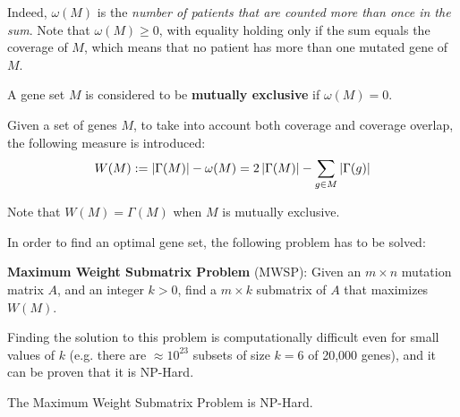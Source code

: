 Indeed, $\omega(M)$ is the \textit{number of patients that are counted more than once in the sum}. Note that $\omega(M) \ge 0$, with equality holding only if the sum equals the coverage of $M$, which means that no patient has more than one mutated gene of $M$.

\begin{definition}
    A gene set $M$ is considered to be \textbf{mutually exclusive} if $\omega(M) = 0$.
\end{definition}

\begin{definition} \label{weight}
    Given a set of genes $M$, to take into account both coverage and coverage overlap, the following measure is introduced: $$W(M): = \left|\Gamma(M)\right| - \omega(M) = 2 \left|\Gamma(M)\right| - \sum_{g \in M} {\left|\Gamma(g)\right|}$$
\end{definition}

Note that $W(M) = \Gamma(M)$ when $M$ is mutually exclusive.

In order to find an optimal gene set, the following problem has to be solved:

\begin{displayquote}\label{mwsp}
    \textbf{Maximum Weight Submatrix Problem} (MWSP): Given an $m \times n$ mutation matrix $A$, and an integer $k > 0$, find a $m \times k$ submatrix of $A$ that maximizes $W(M)$.
\end{displayquote}

Finding the solution to this problem is computationally difficult even for small values of $k$ (e.g. there are $\approx 10^{23}$ subsets of size $k = 6$ of 20,000 genes), and it can be proven that it is NP-Hard.

\begin{theorem}
    The Maximum Weight Submatrix Problem is NP-Hard.
\end{theorem}

